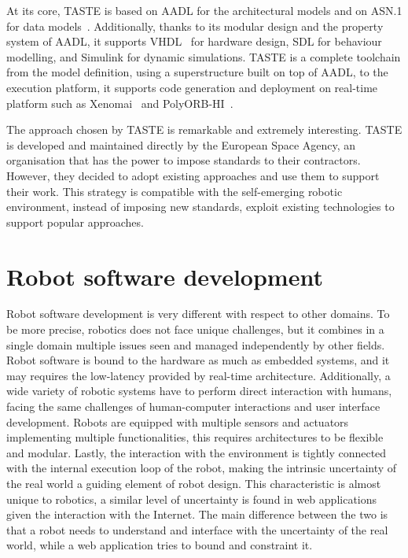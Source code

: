 At its core, TASTE is based on AADL for the architectural models and on ASN.1 for data models~\cite{perrotin2011taste}. Additionally, thanks to its modular design and the property system of AADL, it supports VHDL~\cite{navabi1997vhdl} for hardware design, SDL for behaviour modelling, and Simulink for dynamic simulations. TASTE is a complete toolchain from the model definition, using a superstructure built on top of AADL, to the execution platform, it supports code generation and deployment on real-time platform such as Xenomai~\cite{gerum2004xenomai} and PolyORB-HI~\cite{vergnaud2004polyorb}.

The approach chosen by TASTE is remarkable and extremely interesting. TASTE is developed and maintained directly by the European Space Agency, an organisation that has the power to impose standards to their contractors. However, they decided to adopt existing approaches and use them to support their work. This strategy is compatible with the self-emerging robotic environment, instead of imposing new standards, exploit existing technologies to support popular approaches.


\section{Robot software development}
Robot software development is very different with respect to other domains. To be more precise, robotics does not face unique challenges, but it combines in a single domain multiple issues seen and managed independently by other fields. Robot software is bound to the hardware as much as embedded systems, and it may requires the low-latency provided by real-time architecture. Additionally, a wide variety of robotic systems have to perform direct interaction with humans, facing the same challenges of human-computer interactions and user interface development. Robots are equipped with multiple sensors and actuators implementing multiple functionalities, this requires architectures to be flexible and modular. Lastly, the interaction with the environment is tightly connected with the internal execution loop of the robot, making the intrinsic uncertainty of the real world a guiding element of robot design. This characteristic is almost unique to robotics, a similar level of uncertainty is found in web applications given the interaction with the Internet. The main difference between the two is that a robot needs to understand and interface with the uncertainty of the real world, while a web application tries to bound and constraint it.


